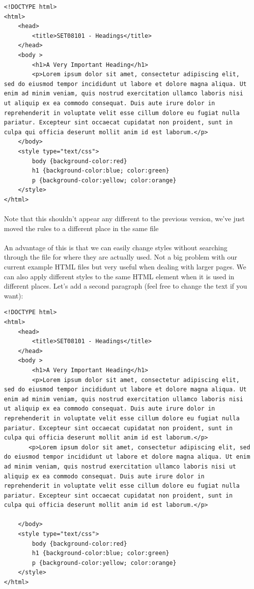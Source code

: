 \documentclass[10pt, a4paper, twosize]{article}
\begin{document}
\begin{lstlisting}
<!DOCTYPE html>
<html>
    <head>
        <title>SET08101 - Headings</title>
    </head>
    <body >
        <h1>A Very Important Heading</h1>
        <p>Lorem ipsum dolor sit amet, consectetur adipiscing elit, sed do eiusmod tempor incididunt ut labore et dolore magna aliqua. Ut enim ad minim veniam, quis nostrud exercitation ullamco laboris nisi ut aliquip ex ea commodo consequat. Duis aute irure dolor in reprehenderit in voluptate velit esse cillum dolore eu fugiat nulla pariatur. Excepteur sint occaecat cupidatat non proident, sunt in culpa qui officia deserunt mollit anim id est laborum.</p>
    </body>
    <style type="text/css">
        body {background-color:red}
        h1 {background-color:blue; color:green}
        p {background-color:yellow; color:orange}
    </style>
</html>
\end{lstlisting}

\paragraph{} Note that this shouldn't appear any different to the previous version, we've just moved the rules to a different place in the same file

\paragraph{} An advantage of this is that we can easily change styles without searching through the file for where they are actually used. Not a big problem with our current example HTML files but very useful when dealing with larger pages. We can also apply different styles to the same HTML element when it is used in different places. Let's add a second paragraph (feel free to change the text if you want):

\begin{lstlisting}
<!DOCTYPE html>
<html>
    <head>
        <title>SET08101 - Headings</title>
    </head>
    <body >
        <h1>A Very Important Heading</h1>
        <p>Lorem ipsum dolor sit amet, consectetur adipiscing elit, sed do eiusmod tempor incididunt ut labore et dolore magna aliqua. Ut enim ad minim veniam, quis nostrud exercitation ullamco laboris nisi ut aliquip ex ea commodo consequat. Duis aute irure dolor in reprehenderit in voluptate velit esse cillum dolore eu fugiat nulla pariatur. Excepteur sint occaecat cupidatat non proident, sunt in culpa qui officia deserunt mollit anim id est laborum.</p>
       <p>Lorem ipsum dolor sit amet, consectetur adipiscing elit, sed do eiusmod tempor incididunt ut labore et dolore magna aliqua. Ut enim ad minim veniam, quis nostrud exercitation ullamco laboris nisi ut aliquip ex ea commodo consequat. Duis aute irure dolor in reprehenderit in voluptate velit esse cillum dolore eu fugiat nulla pariatur. Excepteur sint occaecat cupidatat non proident, sunt in culpa qui officia deserunt mollit anim id est laborum.</p>

    </body>
    <style type="text/css">
        body {background-color:red}
        h1 {background-color:blue; color:green}
        p {background-color:yellow; color:orange}
    </style>
</html>
\end{lstlisting}
\end{document}
